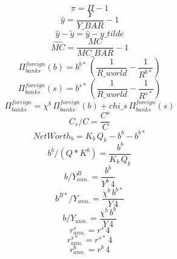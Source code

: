 \begin{dmath}
{ \pi }={ \Pi }-1
\end{dmath}
\begin{dmath}
{ \hat{y} }=\frac{{Y}}{{Y\_BAR}}-1
\end{dmath}
\begin{dmath}
{ \hat{y} - \tilde{y} }={ \hat{y} }-{y\_tilde}
\end{dmath}
\begin{dmath}
{ \hat{MC} }=\frac{{MC}}{{MC\_BAR}}-1
\end{dmath}
\begin{dmath}
{\Pi^{foreign}_{banks}(b)}={b^{b*}}\, \left(\frac{1}{{R\_world}}-\frac{1}{{R^{b*}}}\right)
\end{dmath}
\begin{dmath}
{\Pi^{foreign}_{banks}(s)}={b^{s*}}\, \left(\frac{1}{{R\_world}}-\frac{1}{{R^{s*}}}\right)
\end{dmath}
\begin{dmath}
{\Pi^{foreign}_{banks}}={\chi^b }\, {\Pi^{foreign}_{banks}(b)}+{chi\_s}\, {\Pi^{foreign}_{banks}(s)}
\end{dmath}
\begin{dmath}
{ C_s / C  }=\frac{{C^s}}{{C}}
\end{dmath}
\begin{dmath}
{ NetWorth_b }={K_b}\, { Q_k }-{b^b}-{b^{b*}}
\end{dmath}
\begin{dmath}
{ b^b / (Q * K^b) }=\frac{{b^b}}{{K_b}\, { Q_k }}
\end{dmath}
\begin{dmath}
{ b / Y^B_{ann.} }=\frac{{b^b}}{{Y^b}\, 4}
\end{dmath}
\begin{dmath}
{ b^{B*}/ Y_{ann.} }=\frac{{\chi^b }\, {b^{b*}}}{{Y}\, 4}
\end{dmath}
\begin{dmath}
{b/ Y_{ann.} }=\frac{{\chi^b }\, {b^b}}{{Y}\, 4}
\end{dmath}
\begin{dmath}
{r^s_{ann.}}={r^s}\, 4
\end{dmath}
\begin{dmath}
{r^{s*}_{ann.}}={r^{s*}}\, 4
\end{dmath}
\begin{dmath}
{r^b_{ann.}}={r^b}\, 4
\end{dmath}
